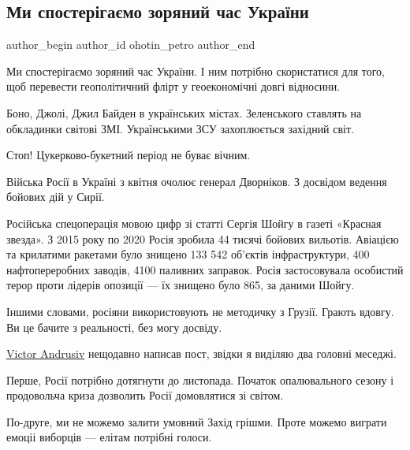  
 
 
 
 
 
\subsection{Ми спостерігаємо зоряний час України}
\label{sec:09_05_2022.fb.ohotin_petro.1.zorjanyj_chas_ukrainy}
 
\ifcmt
 author_begin
   author_id ohotin_petro
 author_end
\fi

Ми спостерігаємо зоряний час України. І ним потрібно скористатися для того, щоб
перевести геополітичний флірт у геоекономічні довгі відносини. 

Боно, Джолі, Джил Байден в українських містах. Зеленського ставлять на
обкладинки світові ЗМІ. Українськими ЗСУ захоплюється західний світ. 

Стоп! Цукерково-букетний період не буває вічним. 

Війська Росії в Україні  з квітня очолює генерал Дворніков. З досвідом ведення
бойових дій у Сирії. 

Російська спецоперація мовою цифр зі статті Сергія Шойгу в газеті «Красная
звезда». З 2015 року по 2020 Росія зробила 44 тисячі бойових вильотів. Авіацією
та крилатими ракетами було знищено 133 542  об'єктів інфраструктури, 400
нафтопереробних заводів, 4100 паливних заправок. Росія застосовувала особистий
терор проти лідерів опозиції — їх знищено було 865, за даними Шойгу. 

Іншими словами, росіяни використовують не методичку з Грузії. Грають вдовгу. Ви
це бачите з реальності, без могу досвіду. 

\href{https://www.facebook.com/victor.andrusiv}{Victor Andrusiv} нещодавно
написав пост, звідки я виділяю два головні меседжі. 

Перше, Росії потрібно дотягнути до листопада. Початок опалювального сезону і
продовольча криза дозволить Росії домовлятися зі світом.

По-друге, ми не можемо залити умовний Захід грішми. Проте можемо виграти емоціі
виборців — елітам потрібні голоси. 

